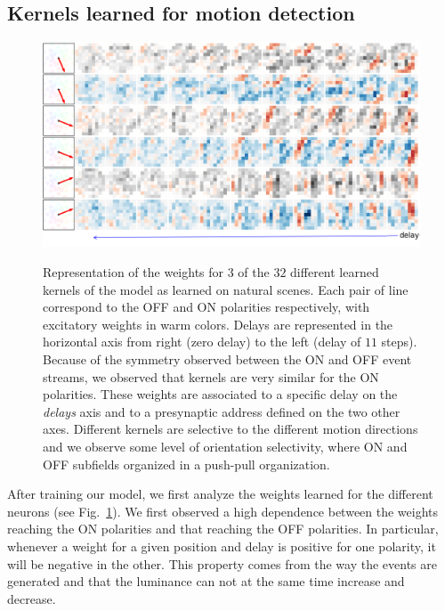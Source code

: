 \documentclass[default]{sn-jnl}%
\theoremstyle{thmstyleone}%
\theoremstyle{thmstyletwo}%
\theoremstyle{thmstylethree}%
\newcommand{\seeFig}[1]{see Fig.~\ref{fig:#1}}%
\begin{document}
\subsection{Kernels learned for motion detection}
\begin{figure}[ht!]
    {\centering
    \includegraphics[width=\linewidth]{figures/motion_kernels.png}%
    }
    \caption{
    	Representation of the weights for $3$ of the $32$ different learned kernels of the model as learned on natural scenes. Each pair of line correspond to the OFF and ON polarities respectively, with excitatory weights in warm colors. Delays are represented in the horizontal axis from right (zero delay) to the left (delay of $11$ steps). Because of the symmetry observed between the ON and OFF event streams, we observed that kernels are very similar for the ON polarities. These weights are associated to a specific delay on the \textit{delays} axis and to a presynaptic address defined on the two other axes. %
	Different kernels are selective to the different motion directions and we observe some level of orientation selectivity, where ON and OFF subfields organized in a push-pull organization. 
	}
    \label{fig:kernels}
\end{figure} 
%
%
After training our model, we first analyze the weights learned for the different neurons (\seeFig{kernels}). 
We first observed a high dependence between the weights reaching the ON polarities and that reaching the OFF polarities. In particular, whenever a weight for a given position and delay is positive for one polarity, it will be negative in the other. This property comes from the way the events are generated and that the luminance can not at the same time increase and decrease. %
\end{document}
